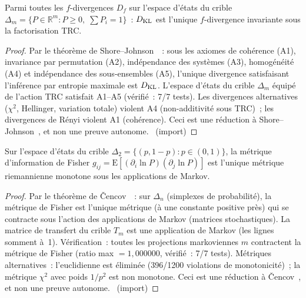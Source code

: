 \documentclass[12pt,a4paper]{article}
\begin{document}
\begin{theoreme}
\label{thm:G1:ch02}
Parmi toutes les $f$-divergences $D_f$ sur l'espace d'états du crible
$\Delta_m = \{P \in \mathbb{R}^m : P \geq 0,\; \sum P_i = 1\}$~:
$D_{\mathrm{KL}}$ est l'unique $f$-divergence invariante sous la factorisation
TRC.

\begin{proof}
Par le théorème de Shore--Johnson~\cite{ShoreJohnson1980}~: sous les
axiomes de cohérence (A1), invariance par permutation (A2),
indépendance des systèmes (A3), homogénéité (A4) et indépendance des
sous-ensembles (A5), l'unique divergence satisfaisant l'inférence par
entropie maximale est $D_{\mathrm{KL}}$. L'espace d'états du crible $\Delta_m$
équipé de l'action TRC satisfait A1--A5 (vérifié~: 7/7 tests).
Les divergences alternatives ($\chi^2$, Hellinger, variation totale)
violent A4 (non-additivité sous TRC)~; les divergences de Rényi
violent A1 (cohérence). Ceci est une réduction à
Shore--Johnson~\cite{ShoreJohnson1980}, et non une preuve autonome.
\THMTAG~(import)
\end{proof}
\end{theoreme}

\begin{theoreme}
\label{thm:G3:ch02}
Sur l'espace d'états du crible $\Delta_2 = \{(p, 1-p) : p \in (0,1)\}$,
la métrique d'information de Fisher
$g_{ij} = \mathrm{E}[(\partial_i \ln P)(\partial_j \ln P)]$ est
l'unique métrique riemannienne monotone sous les applications de
Markov.

\begin{proof}
Par le théorème de \v{C}encov~\cite{Cencov1982}~: sur $\Delta_n$
(simplexes de probabilité), la métrique de Fisher est l'unique
métrique (à une constante positive près) qui se contracte sous
l'action des applications de Markov (matrices stochastiques). La
matrice de transfert du crible $T_m$ est une application de Markov
(les lignes somment à~1). Vérification~: toutes les projections
markoviennes $m$ contractent la métrique de Fisher (ratio max
$= 1{,}000000$, vérifié~: 7/7 tests). Métriques alternatives~:
l'euclidienne est éliminée (396/1200 violations de monotonicité)~;
la métrique $\chi^2$ avec poids $1/p^2$ est non monotone. Ceci est
une réduction à \v{C}encov~\cite{Cencov1982}, et non une preuve
autonome.
\THMTAG~(import)
\end{proof}
\end{theoreme}
\end{document}
